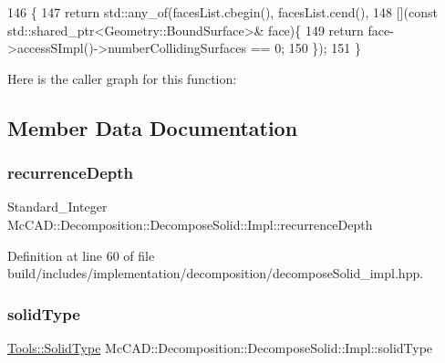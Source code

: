 \begin{DoxyCode}
146                                                                         \{
147     \textcolor{keywordflow}{return} std::any\_of(facesList.cbegin(), facesList.cend(),
148                        [](\textcolor{keyword}{const} std::shared\_ptr<Geometry::BoundSurface>& face)\{
149         \textcolor{keywordflow}{return} face->accessSImpl()->numberCollidingSurfaces == 0;
150     \});
151 \}
\end{DoxyCode}
Here is the caller graph for this function\+:


\subsection{Member Data Documentation}
\mbox{\label{classMcCAD_1_1Decomposition_1_1DecomposeSolid_1_1Impl_ad908b2687b52f636d8368b814aa5f770}} 
\subsubsection{\texorpdfstring{recurrence\+Depth}{recurrenceDepth}}
{\footnotesize\ttfamily Standard\+\_\+\+Integer Mc\+C\+A\+D\+::\+Decomposition\+::\+Decompose\+Solid\+::\+Impl\+::recurrence\+Depth}



Definition at line 60 of file build/includes/implementation/decomposition/decompose\+Solid\+\_\+impl.\+hpp.

\mbox{\label{classMcCAD_1_1Decomposition_1_1DecomposeSolid_1_1Impl_ad808642e410eb4b8fa0d42b9a8ca3715}} 
\subsubsection{\texorpdfstring{solid\+Type}{solidType}}
{\footnotesize\ttfamily \hyperlink{classMcCAD_1_1Tools_1_1SolidType}{Tools\+::\+Solid\+Type} Mc\+C\+A\+D\+::\+Decomposition\+::\+Decompose\+Solid\+::\+Impl\+::solid\+Type}



